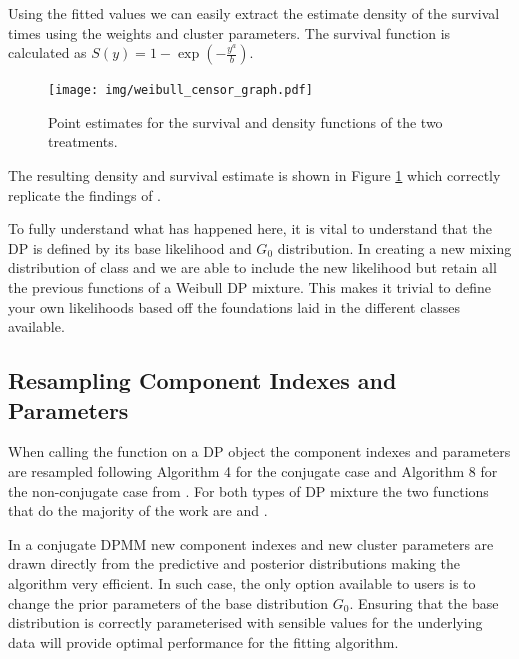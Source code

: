 \documentclass[nojss]{jss}
\begin{document}
Using the fitted values we can easily extract the estimate density of the survival times using the weights and cluster parameters. The survival function is calculated as $S(y) = 1 - \exp(- \frac{y ^a}{b})$.
\begin{figure}
\centering
\texttt{[image: img/weibull\_censor\_graph.pdf]}
\caption{Point estimates for the survival and density functions of the two treatments.}
\label{fig:weibull_cens}
\end{figure}
The resulting density and survival estimate is shown in Figure \ref{fig:weibull_cens} which correctly replicate the findings of \cite{kottas_nonparametric_2006}.

To fully understand what has happened here, it is vital to understand that the DP is defined by its base likelihood and $G_0$ distribution. In creating a new mixing distribution of class  and  we are able to include the new likelihood but retain all the previous functions of a Weibull DP mixture. This makes it trivial to define your own likelihoods based off the foundations laid in the different classes available.


\subsection{Resampling Component Indexes and Parameters}
When calling the  function on a DP object the component indexes and parameters are resampled following Algorithm 4 for the conjugate case and Algorithm 8 for the non-conjugate case from \cite{neal_markov_2000}. For both types of DP mixture the two functions that do the majority of the work are  and .

In a conjugate DPMM new component indexes and new cluster parameters are drawn directly from the predictive and posterior distributions making the algorithm very efficient. In such case, the only option available to users is to change the prior parameters of the base distribution $G_0$. Ensuring that the base distribution is correctly parameterised with sensible values for the underlying data will provide optimal performance for the fitting algorithm.
\end{document}
